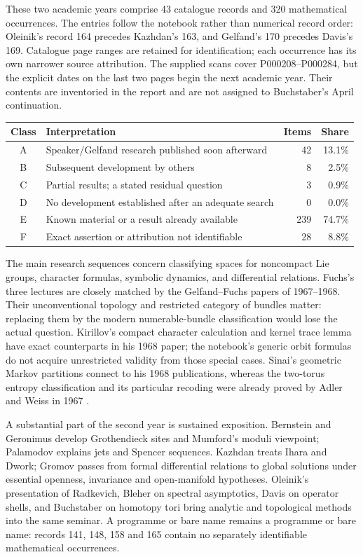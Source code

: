 These two academic years comprise 43 catalogue records and 320 mathematical
occurrences. The entries follow the notebook rather than numerical record
order: Oleinik's record 164 precedes Kazhdan's 163, and Gelfand's 170 precedes
Davis's 169. Catalogue page ranges are retained for identification; each
occurrence has its own narrower source attribution. The supplied scans cover
P000208--P000284, but the explicit dates on the last two pages begin the next
academic year. Their contents are inventoried in the report and are not
assigned to Buchstaber's April continuation.

\begin{center}
\begin{tabular}{@{}clrr@{}}
\toprule
Class & Interpretation & Items & Share \\
\midrule
A & Speaker/Gelfand research published soon afterward & 42 & 13.1\% \\
B & Subsequent development by others & 8 & 2.5\% \\
C & Partial results; a stated residual question & 3 & 0.9\% \\
D & No development established after an adequate search & 0 & 0.0\% \\
E & Known material or a result already available & 239 & 74.7\% \\
F & Exact assertion or attribution not identifiable & 28 & 8.8\% \\
\bottomrule
\end{tabular}
\end{center}

The main research sequences concern classifying spaces for noncompact Lie
groups, character formulas, symbolic dynamics, and differential relations.
Fuchs's three lectures are closely matched by the Gelfand--Fuchs papers of
1967--1968. Their unconventional topology and restricted category of bundles
matter: replacing them by the modern numerable-bundle classification would
lose the actual question. Kirillov's compact character calculation and kernel
trace lemma have exact counterparts in his 1968 paper; the notebook's generic
orbit formulas do not acquire unrestricted validity from those special cases.
Sinai's geometric Markov partitions connect to his 1968 publications, whereas
the two-torus entropy classification and its particular recoding were already
proved by Adler and Weiss in 1967 \citep{gelfandfuchs1967topology,
kirillov1968characters,sinai1968markov,adlerweiss1967entropy}.

A substantial part of the second year is sustained exposition. Bernstein and
Geronimus develop Grothendieck sites and Mumford's moduli viewpoint; Palamodov
explains jets and Spencer sequences. Kazhdan treats Ihara and Dwork; Gromov
passes from formal differential relations to global solutions under essential
openness, invariance and open-manifold hypotheses. Oleinik's presentation of
Radkevich, Bleher on spectral asymptotics, Davis on operator shells, and
Buchstaber on homotopy tori bring analytic and topological methods into the
same seminar. A programme or bare name remains a programme or bare name:
records 141, 148, 158 and 165 contain no separately identifiable mathematical
occurrences.

